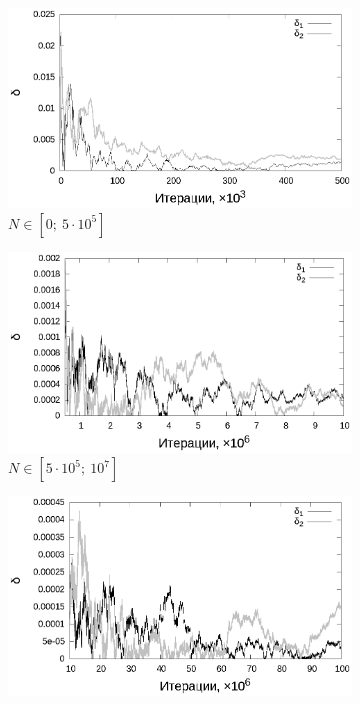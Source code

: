 \documentclass[11pt,a4paper]{article}
\theoremstyle{definition}
\begin{document}
\begin{figure}[h!]
  \begin{subfigure}[b]{0.3\textwidth}
    \includegraphics[width=\textwidth]{figs/classic/linear_log_1x_2_samples_10_variance_10_norm.log_0_500.eps}
    \caption{$N \in [0;~5 \cdot 10^5]$}
    \label{fig:classic_var10_n10_begin}
  \end{subfigure}
  \begin{subfigure}[b]{0.3\textwidth}
    \includegraphics[width=\textwidth]{figs/classic/linear_log_1x_2_samples_10_variance_10_norm.log_500_10000.eps}
    \caption{$N \in [5 \cdot 10^5;~10^7]$}
    \label{fig:classic_var10_n10_middle}
  \end{subfigure}
  \begin{subfigure}[b]{0.3\textwidth}
    \includegraphics[width=\textwidth]{figs/classic/linear_log_1x_2_samples_10_variance_10_norm.log_end.eps}

\end{subfigure}
\end{figure}
\end{document}
